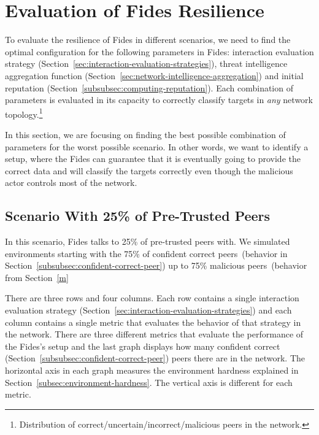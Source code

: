 \section{Evaluation of Fides Resilience}
\label{sec:fides-resilience}

To evaluate the resilience of Fides in different scenarios, we need to find the optimal configuration for the following parameters in Fides: interaction evaluation strategy (Section~\ref{sec:interaction-evaluation-strategies}), threat intelligence aggregation function (Section~\ref{sec:network-intelligence-aggregation}) and initial reputation (Section~\ref{subsubsec:computing-reputation}). Each combination of parameters is evaluated in its capacity to correctly classify targets in \textit{any} network topology.\footnote{Distribution of correct/uncertain/incorrect/malicious peers in the network.}

In this section, we are focusing on finding the best possible combination of parameters for the worst possible scenario. In other words, we want to identify a setup, where the Fides can guarantee that it is eventually going to provide the correct data and will classify the targets correctly even though the malicious actor controls most of the network.


\subsection{Scenario With 25\% of Pre-Trusted Peers}
\label{subsec:correct-target-identification-no-matter-what}

In this scenario, Fides talks to 25\% of pre-trusted peers with. We simulated environments starting with the 75\% of confident correct peers~(behavior in Section~\ref{subsubsec:confident-correct-peer}) up to 75\% malicious peers~(behavior from Section~\ref{m}


There are three rows and four columns. Each row contains a single interaction evaluation strategy (Section~\ref{sec:interaction-evaluation-strategies}) and each column contains a single metric that evaluates the behavior of that strategy in the network.
There are three different metrics that evaluate the performance of the Fides's setup and the last graph displays how many confident correct (Section~\ref{subsubsec:confident-correct-peer}) peers there are in the network.
The horizontal axis in each graph measures the environment hardness explained in Section~\ref{subsec:environment-hardness}.
The vertical axis is different for each metric.

